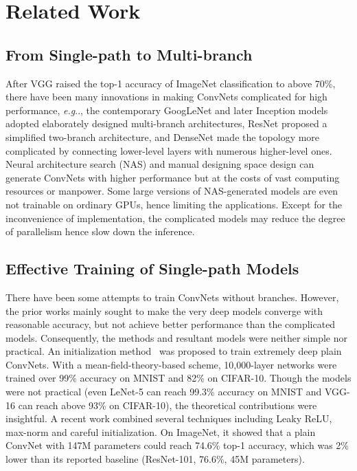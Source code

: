 \documentclass[final]{cvpr}
\makeatletter
\DeclareRobustCommand\onedot{\futurelet\@let@token\@onedot}
\def\@onedot{\ifx\@let@token.\else.\null\fi\xspace}
\def\eg{\emph{e.g}\onedot}
\makeatother
\begin{document}
\section{Related Work}

\subsection{From Single-path to Multi-branch}

After VGG \cite{simonyan2014very} raised the top-1 accuracy of ImageNet classification to above 70\%, there have been many innovations in making ConvNets complicated for high performance, \eg, the contemporary GoogLeNet \cite{szegedy2015going} and later Inception models \cite{szegedy2016rethinking,szegedy2017inception,ioffe2015batch} adopted elaborately designed multi-branch architectures, ResNet \cite{he2016deep} proposed a simplified two-branch architecture, and DenseNet \cite{huang2017densely} made the topology more complicated by connecting lower-level layers with numerous higher-level ones. Neural architecture search (NAS) \cite{zoph2018learning,real2019regularized,liu2018progressive,efficientnet} and manual designing space design \cite{regnet} can generate ConvNets with higher performance but at the costs of vast computing resources or manpower. Some large versions of NAS-generated models are even not trainable on ordinary GPUs, hence limiting the applications. Except for the inconvenience of implementation, the complicated models may reduce the degree of parallelism \cite{ma2018shufflenet} hence slow down the inference.


\subsection{Effective Training of Single-path Models}\label{sect-related-work-2}


There have been some attempts to train ConvNets without branches. However, the prior works mainly sought to make the very deep models converge with reasonable accuracy, but not achieve better performance than the complicated models. Consequently, the methods and resultant models were neither simple nor practical. An initialization method~\cite{xiao2018dynamical} was proposed to train extremely deep plain ConvNets. With a mean-field-theory-based scheme, 10,000-layer networks were trained over 99\% accuracy on MNIST and 82\% on CIFAR-10. Though the models were not practical (even LeNet-5 \cite{lecun1998gradient} can reach 99.3\% accuracy on MNIST and VGG-16 can reach above 93\% on CIFAR-10), the theoretical contributions were insightful. A recent work \cite{oyedotun2020going} combined several techniques including Leaky ReLU, max-norm and careful initialization. On ImageNet, it showed that a plain ConvNet with 147M parameters could reach 74.6\% top-1 accuracy, which was 2\% lower than its reported baseline (ResNet-101, 76.6\%, 45M parameters). 
\end{document}
